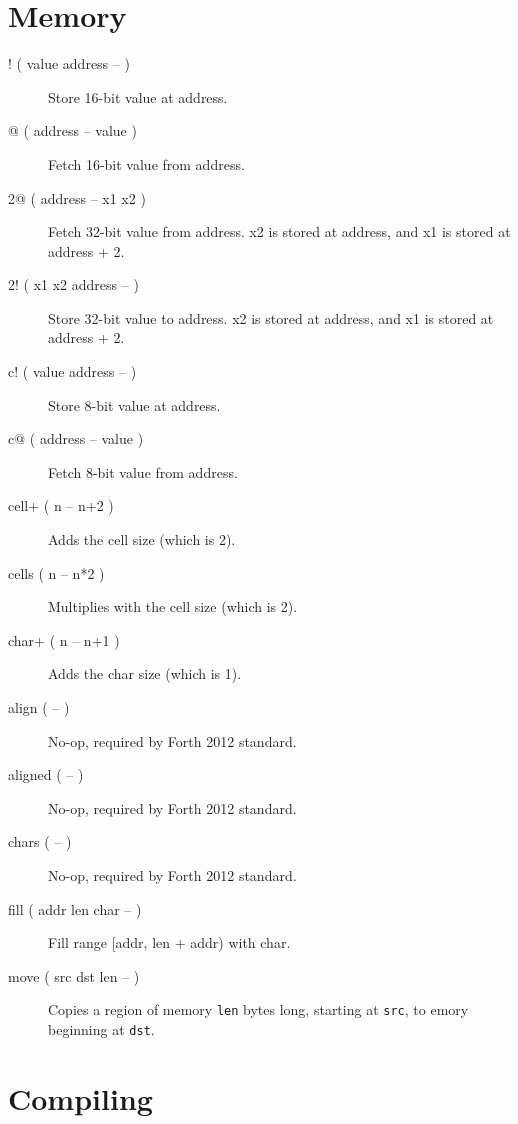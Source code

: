 \section{Memory}

\begin{description}
\item[! ( value address -- )] Store 16-bit value at address.  
\item[@ ( address -- value )] Fetch 16-bit value from address.  
\item[2@ ( address -- x1 x2 )] Fetch 32-bit value from address. x2 is stored at address, and x1 is stored at address + 2.
\item[2! ( x1 x2 address -- )] Store 32-bit value to address. x2 is stored at address, and x1 is stored at address + 2.
\item[c! ( value address -- )] Store 8-bit value at address.  
\item[c@ ( address -- value )] Fetch 8-bit value from address.
\item[cell+ ( n -- n+2 )] Adds the cell size (which is 2).
\item[cells ( n -- n*2 )] Multiplies with the cell size (which is 2).
\item[char+ ( n -- n+1 )] Adds the char size (which is 1).
\item[align ( -- )] No-op, required by Forth 2012 standard.
\item[aligned ( -- )] No-op, required by Forth 2012 standard.
\item[chars ( -- )] No-op, required by Forth 2012 standard.
\item[fill ( addr len char -- )] Fill range [addr, len + addr) with char.
\item[move ( src dst len -- )]
Copies a region of memory \texttt{len} bytes long, starting at \texttt{src}, to emory beginning at \texttt{dst}. 

\end{description}
\section{Compiling}

